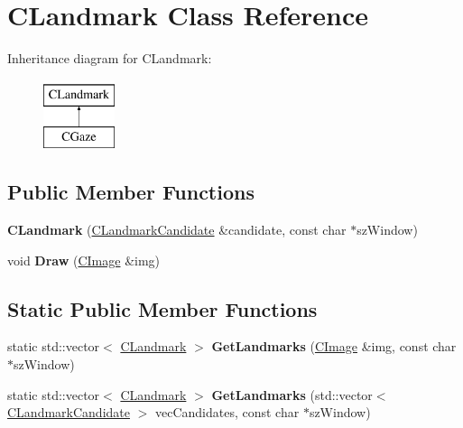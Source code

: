 \hypertarget{class_c_landmark}{}\section{C\+Landmark Class Reference}
\label{class_c_landmark}
Inheritance diagram for C\+Landmark\+:\begin{figure}[H]
\begin{center}
\leavevmode
\includegraphics[height=2.000000cm]{class_c_landmark}
\end{center}
\end{figure}
\subsection*{Public Member Functions}
\begin{DoxyCompactItemize}
\item 
\mbox{\label{class_c_landmark_a2dceda1ec703ddb81f460a73d8bb97cf}} 
{\bfseries C\+Landmark} (\hyperlink{class_c_landmark_candidate}{C\+Landmark\+Candidate} \&candidate, const char $\ast$sz\+Window)
\item 
\mbox{\label{class_c_landmark_a1c753bf659bf8b4dbd2b7f118193fa65}} 
void {\bfseries Draw} (\hyperlink{class_c_image}{C\+Image} \&img)
\end{DoxyCompactItemize}
\subsection*{Static Public Member Functions}
\begin{DoxyCompactItemize}
\item 
\mbox{\label{class_c_landmark_ad601efa5dbb5955f99b69901bbcac77e}} 
static std\+::vector$<$ \hyperlink{class_c_landmark}{C\+Landmark} $>$ {\bfseries Get\+Landmarks} (\hyperlink{class_c_image}{C\+Image} \&img, const char $\ast$sz\+Window)
\item 
\mbox{\label{class_c_landmark_a1666a626e9533609b2810299992115b7}} 
static std\+::vector$<$ \hyperlink{class_c_landmark}{C\+Landmark} $>$ {\bfseries Get\+Landmarks} (std\+::vector$<$ \hyperlink{class_c_landmark_candidate}{C\+Landmark\+Candidate} $>$ vec\+Candidates, const char $\ast$sz\+Window)
\end{DoxyCompactItemize}
